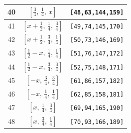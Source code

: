 \documentclass[fleqn,8pt]{jsarticle}
\begin{document}
\begin{longtable}{ccc}
40 & $\left[ \frac{3}{4},\, \frac{1}{4},\, x \right]$ & {\tt [48,63,144,159]} \\ \hline
41 & $\left[ x + \frac{1}{2},\, \frac{1}{4},\, \frac{3}{4} \right]$ & {\tt [49,74,145,170]} \\ \hline
42 & $\left[ x + \frac{1}{2},\, \frac{3}{4},\, \frac{1}{4} \right]$ & {\tt [50,73,146,169]} \\ \hline
43 & $\left[ \frac{1}{2} - x,\, \frac{1}{4},\, \frac{1}{4} \right]$ & {\tt [51,76,147,172]} \\ \hline
44 & $\left[ \frac{1}{2} - x,\, \frac{3}{4},\, \frac{3}{4} \right]$ & {\tt [52,75,148,171]} \\ \hline
45 & $\left[ - x,\, \frac{3}{4},\, \frac{3}{4} \right]$ & {\tt [61,86,157,182]} \\ \hline
46 & $\left[ - x,\, \frac{1}{4},\, \frac{1}{4} \right]$ & {\tt [62,85,158,181]} \\ \hline
47 & $\left[ x,\, \frac{1}{4},\, \frac{3}{4} \right]$ & {\tt [69,94,165,190]} \\ \hline
48 & $\left[ x,\, \frac{3}{4},\, \frac{1}{4} \right]$ & {\tt [70,93,166,189]} \\
\end{longtable}
\renewcommand{\arraystretch}{1.2}
\end{document}
